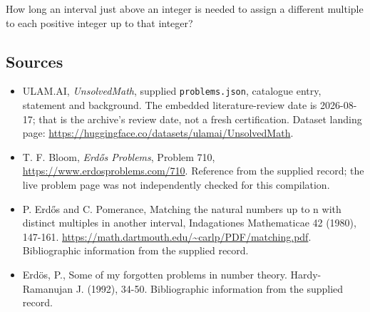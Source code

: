 \documentclass[11pt,a4paper]{article}
\begin{document}
How long an interval just above an integer is needed to assign a different multiple to each positive integer up to that integer?

\subsection{Sources}

{\small

\begin{itemize}

\item[\hypertarget{source:statement:1}{S1}] ULAM.AI, \emph{UnsolvedMath}, supplied \texttt{problems.json}, catalogue entry, statement and background. The embedded literature-review date is 2026-08-17; that is the archive’s review date, not a fresh certification. Dataset landing page: \url{https://huggingface.co/datasets/ulamai/UnsolvedMath}.

\item[\hypertarget{source:statement:2}{S2}] T. F. Bloom, \emph{Erdős Problems}, Problem 710, \url{https://www.erdosproblems.com/710}. Reference from the supplied record; the live problem page was not independently checked for this compilation.

\item[\hypertarget{source:statement:3}{S3}] P. Erdős and C. Pomerance, Matching the natural numbers up to n with distinct multiples in another interval, Indagationes Mathematicae 42 (1980), 147-161. \url{https://math.dartmouth.edu/~carlp/PDF/matching.pdf}. Bibliographic information from the supplied record.

\item[\hypertarget{source:statement:4}{S4}] Erd\"{o}s, P., Some of my forgotten problems in number theory. Hardy-Ramanujan J. (1992), 34-50. Bibliographic information from the supplied record.

\end{itemize}

}

\label{end:statement}
\end{document}
